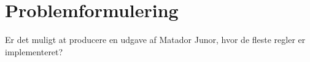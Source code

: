 \chapter{Problemformulering}
Er det muligt at producere en udgave af Matador Junor, hvor de fleste regler er implementeret?
